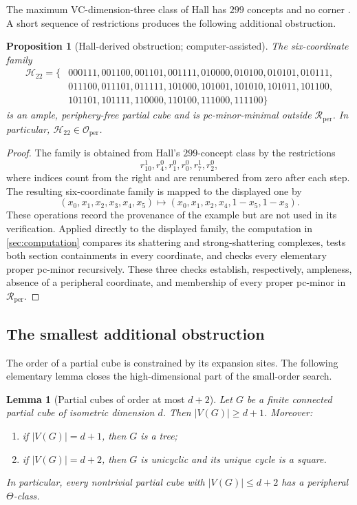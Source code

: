 \documentclass[11pt]{article}
\newtheorem{lemma}[theorem]{Lemma}
\newtheorem{proposition}[theorem]{Proposition}
\theoremstyle{definition}
\theoremstyle{remark}
\newcommand{\Rper}{\mathcal R_{\mathrm{per}}}
\newcommand{\Oper}{\mathcal O_{\mathrm{per}}}
\begin{document}
The maximum VC-dimension-three class of Hall has \(299\) concepts and no
corner \cite[Theorem~4.5]{ChalopiChepoiMoran22}.  A short sequence of
restrictions produces the following additional obstruction.

\begin{proposition}[Hall-derived obstruction; computer-assisted]
\label{prop:hall-obstruction}
The six-coordinate family
\begin{align*}
 \mathcal H_{22}=\{&
 000111,001100,001101,001111,010000,010100,010101,010111,\\
 &011100,011101,011111,101000,101001,101010,101011,101100,\\
 &101101,101111,110000,110100,111000,111100\}
\end{align*}
 is an ample, periphery-free partial cube and is pc-minor-minimal outside
 \(\Rper\).
In particular, \(\mathcal H_{22}\in\Oper\).
\end{proposition}

\begin{proof}
The family is obtained from Hall's \(299\)-concept class by the restrictions
\[
 r^1_{10},r^0_4,r^0_1,r^0_0,r^1_7,r^0_2,
\]
where indices count from the right and are renumbered from zero after each
step. The resulting six-coordinate family is mapped to the displayed one by
\[
 (x_0,x_1,x_2,x_3,x_4,x_5)
 \longmapsto (x_0,x_1,x_2,x_4,1-x_5,1-x_3).
\]
These operations record the provenance of the example but are not used in
its verification. Applied directly to the displayed family, the computation in
\cref{sec:computation} compares its shattering and strong-shattering
complexes, tests both section containments in every coordinate, and checks
every elementary proper pc-minor recursively.  These three checks establish,
respectively, ampleness, absence of a peripheral coordinate, and membership
of every proper pc-minor in \(\Rper\).
\end{proof}

\subsection{The smallest additional obstruction}

The order of a partial cube is constrained by its expansion sites.  The
following elementary lemma closes the high-dimensional part of the
small-order search.

\begin{lemma}[Partial cubes of order at most \(d+2\)]
\label{lem:low-excess}
Let \(G\) be a finite connected partial cube of isometric dimension \(d\).
Then \(|V(G)|\ge d+1\).  Moreover:
\begin{enumerate}[label=\textup{(\roman*)}]
  \item if \(|V(G)|=d+1\), then \(G\) is a tree;
  \item if \(|V(G)|=d+2\), then \(G\) is unicyclic and its unique cycle is
        a square.
\end{enumerate}
In particular, every nontrivial partial cube with
\(|V(G)|\le d+2\) has a peripheral \(\Theta\)-class.
\end{lemma}
\end{document}
